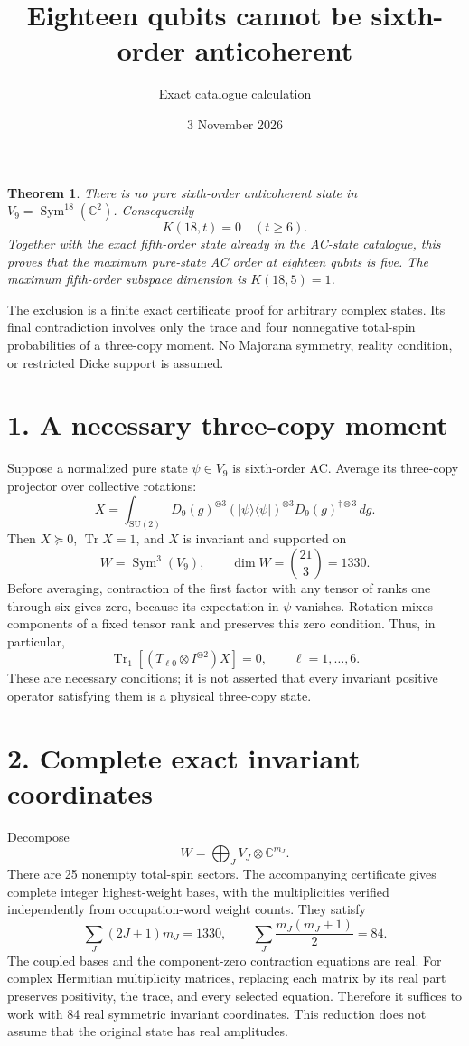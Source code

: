 \documentclass[11pt]{article}
\newtheorem{theorem}{Theorem}
\newcommand{\Tr}{\operatorname{Tr}}
\newcommand{\Sym}{\operatorname{Sym}}
\begin{document}
\title{Eighteen qubits cannot be sixth-order anticoherent}
\author{Exact catalogue calculation}
\date{3 November 2026}
\maketitle
\begin{theorem}
There is no pure sixth-order anticoherent state in
$V_9=\Sym^{18}(\mathbb C^2)$. Consequently
\[
 \boxed{K(18,t)=0\quad(t\ge6).}
\]
Together with the exact fifth-order state already in the AC-state catalogue,
this proves that the maximum pure-state AC order at eighteen qubits is five.
The maximum fifth-order subspace dimension is $K(18,5)=1$.
\end{theorem}
The exclusion is a finite exact certificate proof for arbitrary complex
states. Its final contradiction involves only the trace and four nonnegative
total-spin probabilities of a three-copy moment. No Majorana symmetry,
reality condition, or restricted Dicke support is assumed.

\section*{1. A necessary three-copy moment}
Suppose a normalized pure state $\psi\in V_9$ is sixth-order AC. Average its
three-copy projector over collective rotations:
\[
 X=\int_{\mathrm{SU}(2)}D_9(g)^{\otimes3}
 (|\psi\rangle\langle\psi|)^{\otimes3}
 D_9(g)^{\dagger\otimes3}\,dg.
\]
Then $X\succeq0$, $\Tr X=1$, and $X$ is invariant and supported on
\[
 W=\Sym^3(V_9),\qquad \dim W=\binom{21}{3}=1330.
\]
Before averaging, contraction of the first factor with any tensor of ranks
one through six gives zero, because its expectation in $\psi$ vanishes.
Rotation mixes components of a fixed tensor rank and preserves this zero
condition. Thus, in particular,
\begin{equation}\label{contractions}
 \Tr_1[(T_{\ell0}\otimes I^{\otimes2})X]=0,
 \qquad \ell=1,\ldots,6.
\end{equation}
These are necessary conditions; it is not asserted that every invariant
positive operator satisfying them is a physical three-copy state.

\section*{2. Complete exact invariant coordinates}
Decompose
\[
 W=\bigoplus_J V_J\otimes\mathbb C^{m_J}.
\]
There are 25 nonempty total-spin sectors. The accompanying certificate gives
complete integer highest-weight bases, with the multiplicities verified
independently from occupation-word weight counts. They satisfy
\[
 \sum_J(2J+1)m_J=1330,\qquad
 \sum_J\frac{m_J(m_J+1)}2=84.
\]
The coupled bases and the component-zero contraction equations are real.
For complex Hermitian multiplicity matrices, replacing each matrix by its
real part preserves positivity, the trace, and every selected equation.
Therefore it suffices to work with 84 real symmetric invariant coordinates.
This reduction does not assume that the original state has real amplitudes.
\end{document}
